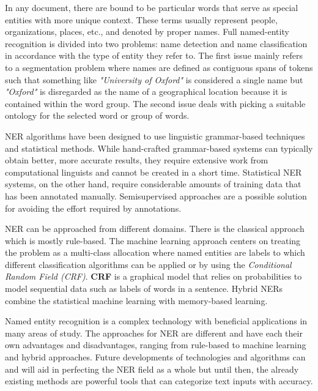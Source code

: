 \documentclass{report}
\begin{document}
In any document, there are bound to be particular words that serve as special entities with more unique context. These terms usually represent people, organizations, places, etc., and denoted by proper names. Full named-entity recognition is divided into two problems: name detection and name classification in accordance with the type of entity they refer to. The first issue mainly refers to a segmentation problem where names are defined as contiguous spans of tokens such that something like \textit{"University of Oxford"} is considered a single name but \textit{"Oxford"} is disregarded as the name of a geographical location because it is contained within the word group. The second issue deals with picking a suitable ontology for the selected word or group of words. \par

NER algorithms have been designed to use linguistic grammar-based techniques and statistical methods. While hand-crafted grammar-based systems can typically obtain better, more accurate results, they require extensive work from computational linguists and cannot be created in a short time. Statistical NER systems, on the other hand, require considerable amounts of training data that has been annotated manually. Semisupervised approaches are a possible solution for avoiding the effort required by annotations. \par

NER can be approached from different domains. There is the classical approach which is mostly rule-based. The machine learning approach centers on treating the problem as a multi-class allocation where named entities are labels to which different classification algorithms can be applied or by using the \textit{Conditional Random Field (CRF)}. \textbf{CRF} is a graphical model that relies on probabilities to model sequential data such as labels of words in a sentence.  Hybrid NERs combine the statistical machine learning with memory-based learning. \par

Named entity recognition is a complex technology with beneficial applications in many areas of study. The approaches for NER are different and have each their own advantages and disadvantages, ranging from rule-based to machine learning and hybrid approaches. Future developments of technologies and algorithms can and will aid in perfecting the NER field as a whole but until then, the already existing methods are powerful tools that can categorize text inputs with accuracy.
\end{document}

